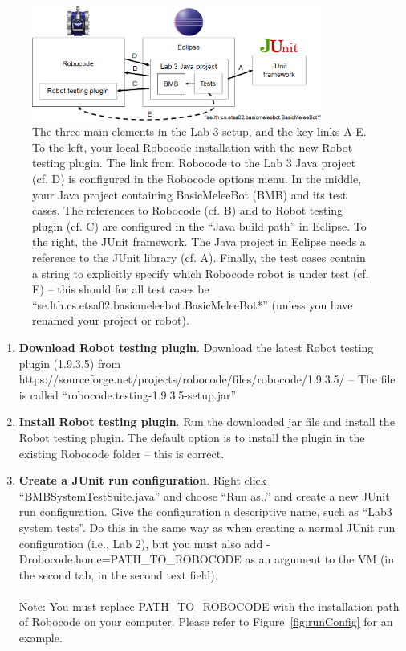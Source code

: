 \documentclass{scrreprt}
\begin{document}
\begin{figure}
\centering
\includegraphics[width=0.85\textwidth]{figures/overview.png}
\caption{The three main elements in the Lab 3 setup, and the key links A-E. To the left, your local Robocode installation with the new Robot testing plugin. The link from Robocode to the Lab 3 Java project (cf. D) is configured in the Robocode options menu. In the middle, your Java project containing BasicMeleeBot (BMB) and its test cases. The references to Robocode (cf. B) and to Robot testing plugin (cf. C) are configured in the ``Java build path'' in Eclipse. To the right, the JUnit framework. The Java project in Eclipse needs a reference to the JUnit library (cf. A). Finally, the test cases contain a string to explicitly specify which Robocode robot is under test (cf. E) -- this should for all test cases be ``se.lth.cs.etsa02.basicmeleebot.BasicMeleeBot*'' (unless you have renamed your project or robot).}
\label{fig:overview}
\end{figure}

\begin{enumerate}
\item \textbf{Download Robot testing plugin}. Download the latest Robot testing plugin (1.9.3.5) from https://sourceforge.net/projects/robocode/files/robocode/1.9.3.5/ -- The file is called ``robocode.testing-1.9.3.5-setup.jar''
\item \textbf{Install Robot testing plugin}. Run the downloaded jar file and 
install the Robot testing plugin. The default option is to install the plugin in the existing Robocode folder -- this is correct.
\item \textbf{Create a JUnit run configuration}. Right click ``BMBSystemTestSuite.java'' and choose ``Run as..'' and create a new JUnit run configuration. Give the configuration a descriptive name, such as ``Lab3 system tests''. Do this in the same way as when creating a normal JUnit run configuration (i.e., Lab 2), but you must also add -Drobocode.home=PATH\_TO\_ROBOCODE as an argument to the VM (in the second tab, in the second text field).\\\\Note: You must replace PATH\_TO\_ROBOCODE with the installation path of Robocode on your computer. Please refer to Figure~\ref{fig:runConfig} for an example.
\end{enumerate}
\end{document}
